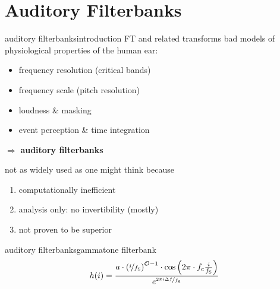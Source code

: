     \section{Auditory Filterbanks}
        \begin{frame}{auditory filterbanks}{introduction}
            FT and related transforms bad models of physiological properties of the human ear:
                \begin{itemize}
                    \item   frequency resolution (critical bands)
                    \item   frequency scale (pitch resolution)
                    \item   loudness \& masking
                    \item   event perception \&  time integration
                \end{itemize}
            
            \smallskip
            $\Rightarrow$ \textbf{auditory filterbanks}
            
            \pause
            \bigskip
            not as widely used as one might think because
            
            \begin{enumerate}
                \item<3->	computationally inefficient
                \item<3->	analysis only: no invertibility (mostly)
                \item<3->	not proven to be superior
            \end{enumerate}
        \end{frame}	

        \begin{frame}{auditory filterbanks}{gammatone filterbank}
            \vspace{-6mm}
            \begin{equation*}
                h(i) = \frac{ a \cdot\left(\nicefrac{i}{f_{\mathrm{S}}}\right)^{\mathcal{O}-1}\cdot \cos\left( 2\pi \cdot f_{\mathrm{c}} \frac{ i}{f_{\mathrm{S}}} \right) }{{e}^{\nicefrac{2\pi i \Delta f}{f_{\mathrm{S}}}}}
            \end{equation*}
            \vspace{-4mm}
        \end{frame}	

